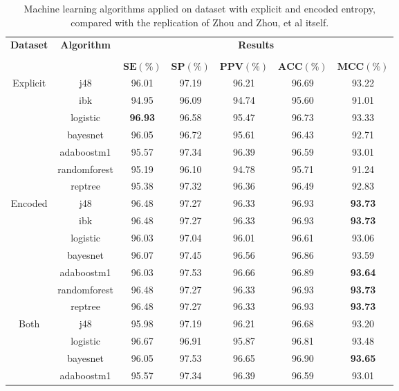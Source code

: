 \begin{table}[h]
\begin{center}
\begin{threeparttable}
\caption{Machine learning algorithms applied on dataset with explicit and encoded entropy, compared with the replication of Zhou and Zhou, et al \cite{zhou2015} itself.}
\label{table:zhou_unimol_explicit_encoded}
\scriptsize
  \begin{tabular}{c c c c c c c}
  \toprule
  \textbf{Dataset} & \textbf{Algorithm} & \multicolumn{5}{c}{\textbf{Results}} \\
  \cline{3-7}
  \\
  & & $\mathbf{SE(\%)}$ & $\mathbf{SP(\%)}$ & $\mathbf{PPV(\%)}$ & $\mathbf{ACC(\%)}$ & $\mathbf{MCC(\%)}$\\
  \midrule  
  Explicit & j48 & 96.01 & 97.19 & 96.21 & 96.69 & 93.22 \\
  & ibk & 94.95 & 96.09 & 94.74 & 95.60 & 91.01 \\
  & logistic & \textbf{96.93} & 96.58 & 95.47 & 96.73 & 93.33 \\
  & bayesnet & 96.05 & 96.72 & 95.61 & 96.43 & 92.71 \\
  & adaboostm1 & 95.57 & 97.34 & 96.39 & 96.59 & 93.01 \\
  & randomforest & 95.19 & 96.10 & 94.78 & 95.71 & 91.24 \\
  & reptree & 95.38 & 97.32 & 96.36 & 96.49 & 92.83 \\
  \hline
  Encoded & j48 &  96.48 &  97.27 &  96.33 &  96.93 &  \textbf{93.73} \\
  & ibk &  96.48 &  97.27 &  96.33 &  96.93 &  \textbf{93.73} \\
  & logistic &  96.03 &  97.04 &  96.01 &  96.61 &  93.06 \\
  & bayesnet &  96.07 &  97.45 &  96.56 &  96.86 &  93.59 \\
  & adaboostm1 &  96.03 &  97.53 &  96.66 &  96.89 &  \textbf{93.64} \\
  & randomforest & 96.48 &  97.27 &  96.33 &  96.93 &  \textbf{93.73} \\
  & reptree & 96.48 &  97.27 &  96.33 &  96.93 &  \textbf{93.73} \\
  \hline
  Both & j48 & 95.98 & 97.19 & 96.21 & 96.68 & 93.20 \\
  & logistic & 96.67 & 96.91 & 95.87 & 96.81 & 93.48 \\
  & bayesnet & 96.05 & 97.53 & 96.65 & 96.90 & \textbf{93.65} \\
  & adaboostm1 & 95.57 & 97.34 & 96.39 & 96.59 & 93.01 \\

\end{tabular}
\end{threeparttable}
\end{center}
\end{table}
